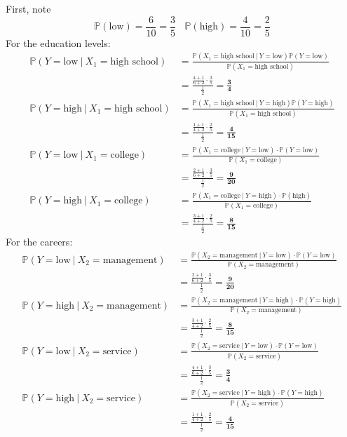 \documentclass[12pt]{article}
\newcommand{\prob}[1]{\mathbb{P}(#1)}
\newcommand{\cprob}[2]{\prob{#1 ~|~ #2}}
\newcommand{\low}{\text{low}}
\newcommand{\high}{\text{high}}
\begin{document}
First, note $$ \prob{\low} = \frac{6}{10} = \frac{3}{5} ~~~~ \prob{\high} = \frac{4}{10} = \frac{2}{5} $$ 
For the education levels: $$ \begin{aligned} 
\cprob{Y = \low}{X_1 = \text{high school}} &= \frac{\cprob{X_1 = \text{high school}}{Y = \low} \prob{Y = \low}}{\prob{X_1 = \text{high school}}} \\ &= \frac{ \frac{4+1}{6+2} \cdot \frac{3}{5}}{\frac{1}{2}} = \bm{\frac{3}{4}} \\ 
\cprob{Y = \high}{X_1 = \text{high school}} &= \frac{\cprob{X_1 = \text{high school}}{Y = \high} \prob{Y = \high}}{\prob{X_1 = \text{high school}}} \\ &= \frac{ \frac{1+1}{4 + 2} \cdot \frac{2}{5}}{\frac{1}{2}} = \bm{\frac{4}{15}} \\ 
\cprob{Y = \low}{X_1 = \text{college}} &= \frac{\cprob{X_1 = \text{college}}{Y = \low} \cdot \prob{Y = \low}}{\prob{X_1 = \text{college}}} \\ &= \frac{ \frac{2+1}{6+2} \cdot \frac{3}{5}}{\frac{1}{2}} = \bm{\frac{9}{20}} \\
\cprob{Y = \high}{X_1 = \text{college}} &= \frac{\cprob{X_1 = \text{college}}{Y = \high} \cdot \prob{\high}}{\prob{X_1 = \text{college}}} \\ &= \frac{ \frac{3+1}{4+2} \cdot \frac{2}{5}}{\frac{1}{2}} = \bm{\frac{8}{15}} \end{aligned} $$ 
For the careers: $$ \begin{aligned} 
\cprob{Y = \low}{X_2 = \text{management}} &= \frac{\cprob{X_2 = \text{management}}{Y = \low} \cdot \prob{Y = \low}}{\prob{X_2 = \text{management}}} \\ &= \frac{ \frac{2+1}{6+2} \cdot \frac{3}{5}}{\frac{1}{2}} = \bm{\frac{9}{20}} \\ 
\cprob{Y = \high}{X_2 = \text{management}} &= \frac{\cprob{X_2 = \text{management}}{Y = \high} \cdot \prob{Y = \high}}{\prob{X_2 = \text{management}}} \\ &= \frac{ \frac{3+1}{4+2} \cdot \frac{2}{5}}{\frac{1}{2}} = \bm{\frac{8}{15}} \\ 
\cprob{Y = \low}{X_2 = \text{service}} &= \frac{\cprob{X_2 = \text{service}}{Y = \low} \cdot \prob{Y = \low}}{\prob{X_2 = \text{service}}} \\ &= \frac{ \frac{4+1}{6+2} \cdot \frac{3}{5}}{\frac{1}{2}} = \bm{\frac{3}{4}} \\
\cprob{Y = \high}{X_2 = \text{service}} &= \frac{\cprob{X_2 = \text{service}}{Y = \high} \cdot \prob{Y = \high}}{\prob{X_2 = \text{service}}} \\ &= \frac{ \frac{1+1}{4+2} \cdot \frac{2}{5}}{\frac{1}{2}} = \bm{\frac{4}{15}} 
\end{aligned} $$ 
\end{document}
